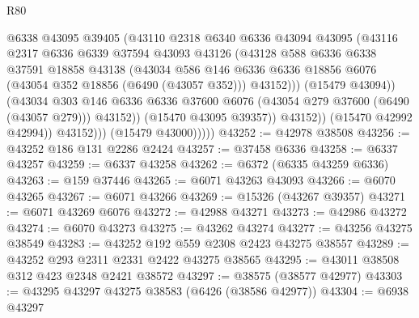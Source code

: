 \begin{lexlean}{R80}
\begin{coremodule}
                            @6338
                            @43095
                            @39405
                            (@43110
                              @2318
                              @6340
                              @6336
                              @43094
                              @43095
                              (@43116
                                @2317
                                @6336
                                @6339
                                @37594
                                @43093
                                @43126
                                (@43128
                                  @588
                                  @6336
                                  @6338
                                  @37591
                                  @18858
                                  @43138
                                  (@43034
                                    @586
                                    @146
                                    @6336
                                    @6336
                                    @18856
                                    @6076
                                    (@43054 @352 @18856 (@6490 (@43057 @352)))
                                    @43152)))
                              (@15479 @43094))
                            (@43034
                              @303
                              @146
                              @6336
                              @6336
                              @37600
                              @6076
                              (@43054 @279 @37600 (@6490 (@43057 @279)))
                              @43152))
                          (@15470 @43095 @39357))
                        @43152))
                    (@15470 @42992 @42994))
                  @43152)))
            (@15479 @43000)))))
@43252 := @42978 @38508
@43256 := @43252 @186 @131 @2286 @2424
@43257 := @37458 @6336
@43258 := @6337 @43257
@43259 := @6337 @43258
@43262 := @6372 (@6335 @43259 @6336)
@43263 := @159 @37446
@43265 := @6071 @43263 @43093
@43266 := @6070 @43265
@43267 := @6071 @43266
@43269 := @15326 (@43267 @39357)
@43271 := @6071 @43269 @6076
@43272 := @42988 @43271
@43273 := @42986 @43272
@43274 := @6070 @43273
@43275 := @43262 @43274
@43277 := @43256 @43275 @38549
@43283 := @43252 @192 @559 @2308 @2423 @43275 @38557
@43289 := @43252 @293 @2311 @2331 @2422 @43275 @38565
@43295 := @43011 @38508 @312 @423 @2348 @2421 @38572
@43297 := @38575 (@38577 @42977)
@43303 := @43295 @43297 @43275 @38583 (@6426 (@38586 @42977))
@43304 := @6938 @43297

\end{coremodule}
\end{lexlean}

